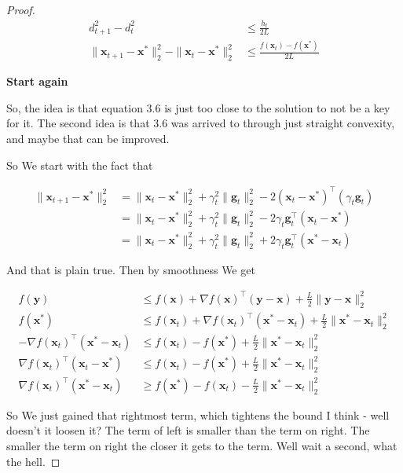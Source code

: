 \documentclass{article}
\begin{document}
\begin{proof}
	\begin{align}
		 d^2_{t+1} - d^2_t &\le \frac{h_t}{2L}\\
		 \|\mathbf{x}_{t+1} - \mathbf{x}^*\|_2^2 - \|\mathbf{x}_t-\mathbf{x}^*\|_2^2 &\le \frac{f(\mathbf{x}_t) - f(\mathbf{x}^*)}{2L}
	\end{align}
	
	\textbf{Start again}
	
	So, the idea is that equation 3.6 is just too close to the solution to not be a key for it. The second idea is that 3.6 was arrived to through just straight convexity, and maybe that can be improved. 
	
	So We start with the fact that 
	
	\begin{align}
		\| \mathbf{x}_{t+1} - \mathbf{x}^*\|^2_2  &= \|\mathbf{x}_t-\mathbf{x}^*\|^2_2 + \gamma_t^2\| \mathbf{g}_t\|^2_2 - 2(\mathbf{x}_t-\mathbf{x}^*)^\top(\gamma_t \mathbf{g}_t) \\
		&= \|\mathbf{x}_t-\mathbf{x}^*\|^2_2 + \gamma_t^2\| \mathbf{g}_t\|^2_2 - 2\gamma_t \mathbf{g}_t^\top (\mathbf{x}_t-\mathbf{x}^*)\\
		&= \|\mathbf{x}_t-\mathbf{x}^*\|^2_2 + \gamma_t^2\| \mathbf{g}_t\|^2_2 + 2\gamma_t \mathbf{g}_t^\top (\mathbf{x}^* - \mathbf{x}_t)
	\end{align}
	
	And that is plain true. Then by smoothness We get
	
	\begin{align}
		f(\mathbf{y}) &\le f(\mathbf{x}) + \nabla f(\mathbf{x})^\top (\mathbf{y}-\mathbf{x}) + \frac{L}{2}\|\mathbf{y}-\mathbf{x}\|^2_2\\
		f(\mathbf{x}^*) &\le f(\mathbf{x}_t) + \nabla f(\mathbf{x}_t)^\top (\mathbf{x}^*-\mathbf{x}_t) + \frac{L}{2}\|\mathbf{x}^*-\mathbf{x}_t\|^2_2\\
		- \nabla f(\mathbf{x}_t)^\top (\mathbf{x}^*-\mathbf{x}_t) &\le f(\mathbf{x}_t) - f(\mathbf{x}^*)  + \frac{L}{2}\|\mathbf{x}^*-\mathbf{x}_t\|^2_2\\
		\nabla f(\mathbf{x}_t)^\top (\mathbf{x}_t - \mathbf{x}^*) &\le f(\mathbf{x}_t) - f(\mathbf{x}^*)  + \frac{L}{2}\|\mathbf{x}^*-\mathbf{x}_t\|^2_2\\
		\nabla f(\mathbf{x}_t)^\top (\mathbf{x}^* - \mathbf{x}_t) &\ge  f(\mathbf{x}^*) - f(\mathbf{x}_t)  - \frac{L}{2}\|\mathbf{x}^*-\mathbf{x}_t\|^2_2
	\end{align}
	
	So We just gained that rightmost term, which tightens the bound I think - well doesn't it loosen it? The term of left is smaller than the term on right. The smaller the term on right the closer it gets to the term. Well wait a second, what the hell. 
	

\end{proof}
\end{document}
